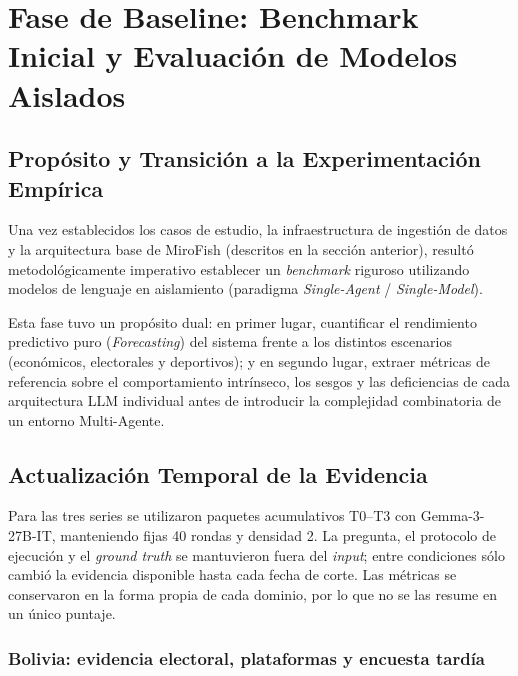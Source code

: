 ﻿\documentclass{article}
\begin{document}
\section{Fase de Baseline: Benchmark Inicial y Evaluación de Modelos Aislados}

\subsection{Propósito y Transición a la Experimentación Empírica}

Una vez establecidos los casos de estudio, la infraestructura de ingestión de datos y la arquitectura base de MiroFish (descritos en la sección anterior), resultó metodológicamente imperativo establecer un \textit{benchmark} riguroso utilizando modelos de lenguaje en aislamiento (paradigma \textit{Single-Agent} / \textit{Single-Model}). 

Esta fase tuvo un propósito dual: en primer lugar, cuantificar el rendimiento predictivo puro (\textit{Forecasting}) del sistema frente a los distintos escenarios (económicos, electorales y deportivos); y en segundo lugar, extraer métricas de referencia sobre el comportamiento intrínseco, los sesgos y las deficiencias de cada arquitectura LLM individual antes de introducir la complejidad combinatoria de un entorno Multi-Agente.

\subsection{Actualización Temporal de la Evidencia}

Para las tres series se utilizaron paquetes acumulativos T0--T3 con Gemma-3-27B-IT, manteniendo fijas 40 rondas y densidad 2. La pregunta, el protocolo de ejecución y el \textit{ground truth} se mantuvieron fuera del \textit{input}; entre condiciones sólo cambió la evidencia disponible hasta cada fecha de corte. Las métricas se conservaron en la forma propia de cada dominio, por lo que no se las resume en un único puntaje.

\subsubsection{Bolivia: evidencia electoral, plataformas y encuesta tardía}
\end{document}
